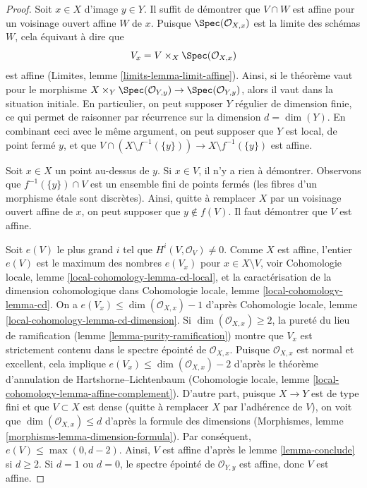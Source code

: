 \begin{proof}
Soit $x \in X$ d'image $y \in Y$. Il suffit de démontrer que
$V \cap W$ est affine pour un voisinage ouvert affine $W$ de $x$.
Puisque $\Spec(\mathcal{O}_{X, x})$ est la limite des schémas $W$,
cela équivaut à dire que
$$
V_x = V \times_X \Spec(\mathcal{O}_{X, x})
$$
est affine (Limites, lemme \ref{limits-lemma-limit-affine}).
Ainsi, si le théorème vaut pour le morphisme
$X \times_Y \Spec(\mathcal{O}_{Y, y}) \to \Spec(\mathcal{O}_{Y, y})$,
alors il vaut dans la situation initiale. En particulier, on peut supposer $Y$
régulier de dimension finie, ce qui permet de raisonner par récurrence
sur la dimension $d = \dim(Y)$. En combinant ceci avec le même argument,
on peut supposer que $Y$ est local, de point fermé $y$, et que
$V \cap (X \setminus f^{-1}(\{y\})) \to X \setminus f^{-1}(\{y\})$
est affine.

\medskip\noindent
Soit $x \in X$ un point au-dessus de $y$. Si $x \in V$, il n'y a
rien à démontrer. Observons que $f^{-1}(\{y\}) \cap V$
est un ensemble fini de points fermés (les fibres d'un morphisme \'etale
sont discrètes). Ainsi, quitte à remplacer $X$
par un voisinage ouvert affine de $x$, on peut supposer que
$y \not \in f(V)$. Il faut démontrer que $V$ est affine.

\medskip\noindent
Soit $e(V)$ le plus grand $i$ tel que $H^i(V, \mathcal{O}_V) \not = 0$.
Comme $X$ est affine, l'entier $e(V)$ est le maximum des nombres $e(V_x)$
pour $x \in X \setminus V$, voir
Cohomologie locale, lemme \ref{local-cohomology-lemma-cd-local},
et la caractérisation de la dimension cohomologique dans
Cohomologie locale, lemme \ref{local-cohomology-lemma-cd}.
On a $e(V_x) \leq \dim(\mathcal{O}_{X, x}) - 1$ d'après
Cohomologie locale, lemme \ref{local-cohomology-lemma-cd-dimension}.
Si $\dim(\mathcal{O}_{X, x}) \geq 2$, la pureté du
lieu de ramification (lemme \ref{lemma-purity-ramification})
montre que $V_x$ est strictement contenu dans le spectre épointé de
$\mathcal{O}_{X, x}$. Puisque $\mathcal{O}_{X, x}$ est
normal et excellent, cela implique
$e(V_x) \leq \dim(\mathcal{O}_{X, x}) - 2$ d'après le théorème
d'annulation de Hartshorne--Lichtenbaum
(Cohomologie locale, lemme \ref{local-cohomology-lemma-affine-complement}).
D'autre part, puisque $X \to Y$ est de type fini
et que $V \subset X$ est dense (quitte à remplacer $X$
par l'adhérence de $V$), on voit que $\dim(\mathcal{O}_{X, x}) \leq d$
d'après la formule des dimensions
(Morphismes, lemme \ref{morphisms-lemma-dimension-formula}).
Par conséquent, $e(V) \leq \max(0, d -  2)$.
Ainsi, $V$ est affine d'après le lemme \ref{lemma-conclude}
si $d \geq 2$. Si $d = 1$ ou $d = 0$, le spectre épointé de
$\mathcal{O}_{Y, y}$ est affine, donc $V$ est affine.
\end{proof}




